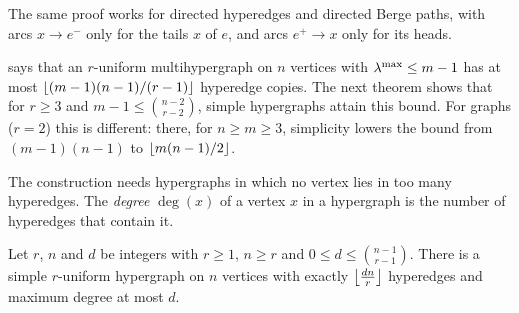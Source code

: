 The same proof works for directed hyperedges and directed Berge paths, with arcs $x \to e^-$ only for the tails $x$ of $e$, and arcs $e^+ \to x$ only for its heads.

 says that an $r$-uniform multihypergraph on $n$ vertices with $\lambda^{\max} \le m-1$ has at most $\left\lfloor (m-1)(n-1)/(r-1) \right\rfloor$ hyperedge copies.
The next theorem shows that for $r \ge 3$ and $m-1\le\binom{n-2}{r-2}$, simple hypergraphs attain this bound.
For graphs ($r=2$) this is different: there, for $n\ge m\ge3$, simplicity lowers the bound from $(m-1)(n-1)$ to $\left\lfloor m(n-1)/2 \right\rfloor$.

The construction needs hypergraphs in which no vertex lies in too many hyperedges. The \emph{degree} $\deg(x)$ of a vertex $x$ in a hypergraph is the number of hyperedges that contain it.

\begin{lemma}\label{lem:sparse-hypergraph}
Let $r$, $n$ and $d$ be integers with $r \ge 1$, $n \ge r$ and $0 \le d \le \binom{n-1}{r-1}$. There is a simple
$r$-uniform hypergraph on $n$ vertices with exactly $\left\lfloor \frac{dn}{r} \right\rfloor$
hyperedges and maximum degree at most $d$.
\end{lemma}

